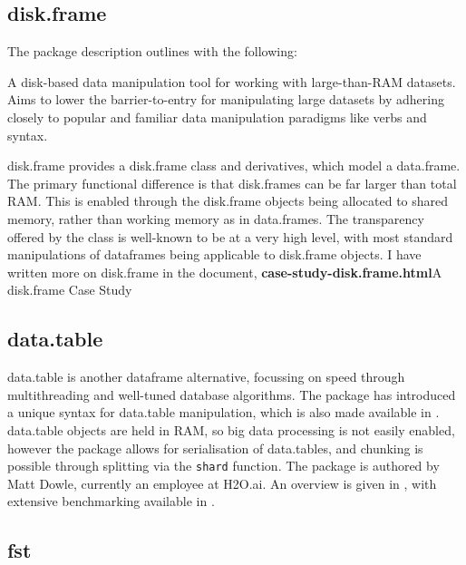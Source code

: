 \hypertarget{sec:disk.frame}{%
    \subsection{disk.frame}\label{sec:disk.frame}}

The package description outlines  with the following:

\begin{displayquote}
    A disk-based data manipulation tool for working with large-than-RAM
    datasets. Aims to lower the barrier-to-entry for manipulating large
    datasets by adhering closely to popular and familiar data manipulation
    paradigms like  verbs and  syntax.
\end{displayquote}

disk.frame provides a disk.frame class and derivatives, which model a
data.frame. The primary functional difference is that disk.frames can be
far larger than total RAM. This is enabled through the disk.frame
objects being allocated to shared memory, rather than working memory as
in data.frames. The transparency offered by the class is well-known to
be at a very high level, with most standard manipulations of dataframes
being applicable to disk.frame objects. I have written more on
disk.frame in the document, \textbf{case-study-disk.frame.html}{A
    disk.frame Case Study}

\hypertarget{sec:data.table}{%
    \subsection{data.table}\label{sec:data.table}}

data.table is another dataframe alternative, focussing on speed through
multithreading and well-tuned database algorithms\cite{dowle19}. The
package has introduced a unique syntax for data.table manipulation,
which is also made available in . data.table objects are held
in RAM, so big data processing is not easily enabled, however the
package allows for serialisation of data.tables, and chunking is
possible through splitting via the \texttt{shard} function. The package
is authored by Matt Dowle, currently an employee at H2O.ai. An overview
is given in \cite{dowle19:_introd}, with extensive benchmarking
available in \cite{dowle19:_bench}.

\hypertarget{sec:fst}{%
    \subsection{fst}\label{sec:fst}}

